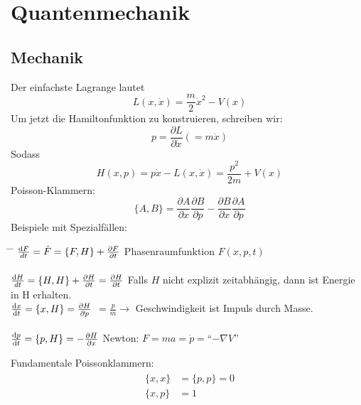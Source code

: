 	
\section{Quantenmechanik} 
	\subsection{Mechanik}
		Der einfachste Lagrange lautet 
			\begin{equation*}
				L (x,\dot{x}) = \frac{m}{2} \dot{x}^2 - V(x) 
			\end{equation*}
		Um jetzt die Hamiltonfunktion zu konstruieren, schreiben wir:
			\begin{equation*}
				p=
				\frac{\partial L}{\partial \dot{x}}
				(=m \dot{x})
			\end{equation*}
		Sodass
			\begin{equation*}
				H(x,p)= 
				p \dot{x} - L(x,\dot{x}) = 
				\frac{p^2}{2m} + V(x)
			\end{equation*}
		Poisson-Klammern:
			\begin{equation*}
				\{A,B\}=
				\frac{\partial A}{\partial x} \frac{\partial B}{\partial p}
				- \frac{\partial B}{\partial x} \frac{\partial A}{\partial p}
			\end{equation*}
		Beispiele mit Spezialfällen:
		\begin{tabbing}
			\hspace{0.4\linewidth} \= \hspace{0.6\linewidth} \= \hfill \kill
			$\frac{\mathrm{d} F}{dt} = \dot{F} = \{F,H\} + \frac{\partial F}{\partial t}$ \> 
			Phasenraumfunktion $F(x,p,t)$ \\ \\
			$\frac{\mathrm{d} H}{dt} = \{H,H\} + \frac{\partial H}{\partial t} = \frac{\partial H}{\partial t}$ \>
			Falls $H$ nicht explizit zeitabhängig, dann ist Energie \\
			\hfill \>  in H erhalten. \\  %
			$\frac{\mathrm{d} x}{\mathrm{d} t} = \{x,H\} = \frac{\partial H}{\partial p}$ \>
			$=\frac{p}{m} \rightarrow$ Geschwindigkeit ist Impuls durch Masse. \\ \\
			$\frac{\mathrm{d} p}{\mathrm{d} t} = \{p,H\} = -\frac{\partial H}{\partial x}$ \>
			Newton: $F= ma= \dot{p} =$``$- \nabla V$''	
		\end{tabbing}
		Fundamentale Poissonklammern:
			\begin{align*}
				\begin{split}
					\{x,x\} &=\{p,p\}= 0 \\
					\{x,p\} &= 1
				\end{split}
			\end{align*}
